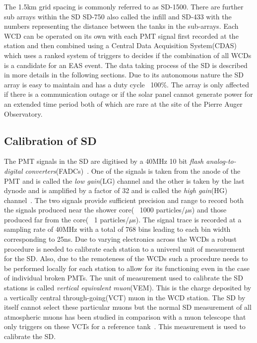 The 1.5km grid spacing is commonly referred to as SD-1500. There are further sub arrays within the SD SD-750 also called the infill and SD-433 with the numbers representing the distance between the tanks in the sub-arrays. Each WCD can be operated on its own with each PMT signal first recorded at the station and then combined using a Central Data Acquisition System(CDAS)~\cite{} which uses a ranked system of triggers to decides if the combination of all WCDs is a candidate for an EAS event. The data taking process of the SD is described in more details in the following sections. Due to its autonomous nature the SD array is easy to maintain and has a duty cycle ~100\%. The array is only affected if there is a communication outage or if the solar panel cannot generate power for an extended time period both of which are rare at the site of the Pierre Auger Observatory.     

\subsection{Calibration of SD}
\label{sec:Sur_det_calib}

The PMT signals in the SD are digitised by a 40MHz 10 bit \textit{flash analog-to-digital converters}(FADCs)~\cite{}. One of the signals is taken from the anode of the PMT and is called the \textit{low gain}(LG) channel and the other is taken by the last dynode and is amplified by a factor of 32 and is called the \textit{high gain}(HG) channel~\cite{}. The two signals provide sufficient precision and range to record both the signals produced near the shower core( ~1000 particles/$\mu$s) and those produced far from the core( ~1 particles/$\mu$s). The signal trace is recorded at a sampling rate of 40MHz with a total of 768 bins leading to each bin width corresponding to 25ns. Due to varying electronics across the WCDs a robust procedure is needed to calibrate each station to a universl unit of measurement for the SD. Also, due to the remoteness of the WCDs such a procedure needs to be performed locally for each station to allow for its functioning even in the case of individual broken PMTs. The unit of measurement used to calibrate the SD stations is called \textit{vertical equivalent muon}(VEM). This is the charge deposited by a vertically central through-going(VCT) muon in the WCD station. The SD by itself cannot select these particular muons but the normal SD measurement of all atmospheric muons has been studied in comparison with a muon telescope that only triggers on these VCTs for a reference tank~\cite{}. This measurement is used to calibrate the SD.

